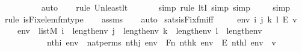 \begin{isabellebody}
\ \ \ \ \ \ \ \isamarkupfalse%
\ auto{\isacharbrackleft}{\kern0pt}{}{\isacharbrackright}{\kern0pt}\isanewline
\ \ \ \isamarkupfalse%
{\isacharparenleft}{\kern0pt}rule\ Un{\isacharunderscore}{\kern0pt}least{\isacharunderscore}{\kern0pt}lt{\isacharparenright}{\kern0pt}{\isacharplus}{\kern0pt}\isanewline
\ \ \ \ \ \ \isamarkupfalse%
{\isacharparenleft}{\kern0pt}simp{\isacharcomma}{\kern0pt}\ rule\ ltI{\isacharcomma}{\kern0pt}\ simp{\isacharcomma}{\kern0pt}\ simp{\isacharparenright}{\kern0pt}{\isacharplus}{\kern0pt}\isanewline
\ \ \ \isamarkupfalse%
\ simp\isanewline
\ \ \isamarkupfalse%
{\isacharparenleft}{\kern0pt}rule\ is{\isacharunderscore}{\kern0pt}Fix{\isacharunderscore}{\kern0pt}elem{\isacharunderscore}{\kern0pt}fm{\isacharunderscore}{\kern0pt}type{\isacharparenright}{\kern0pt}\isanewline
\ \ \isamarkupfalse%
\ assms\isanewline
\ \ \isamarkupfalse%
\ auto%
\endisatagproof
{\isafoldproof}%
%
\isadelimproof
\isanewline
%
\endisadelimproof
\isanewline
{}\isamarkupfalse%
\ sats{\isacharunderscore}{\kern0pt}is{\isacharunderscore}{\kern0pt}Fix{\isacharunderscore}{\kern0pt}fm{\isacharunderscore}{\kern0pt}iff\ {\isacharcolon}{\kern0pt}\ \isanewline
\ \ \ env\ i\ j\ k\ l\ E\ v\ \isanewline
\ \ \ {\isachardoublequoteopen}env\ {\isasymin}\ list{\isacharparenleft}{\kern0pt}M{\isacharparenright}{\kern0pt}{\isachardoublequoteclose}\ {\isachardoublequoteopen}i\ {\isacharless}{\kern0pt}\ length{\isacharparenleft}{\kern0pt}env{\isacharparenright}{\kern0pt}{\isachardoublequoteclose}\ {\isachardoublequoteopen}j\ {\isacharless}{\kern0pt}\ length{\isacharparenleft}{\kern0pt}env{\isacharparenright}{\kern0pt}{\isachardoublequoteclose}\ {\isachardoublequoteopen}k\ {\isacharless}{\kern0pt}\ length{\isacharparenleft}{\kern0pt}env{\isacharparenright}{\kern0pt}{\isachardoublequoteclose}\ {\isachardoublequoteopen}l\ {\isacharless}{\kern0pt}\ length{\isacharparenleft}{\kern0pt}env{\isacharparenright}{\kern0pt}{\isachardoublequoteclose}\isanewline
\ \ \ \ \ \ \ \ \ \ {\isachardoublequoteopen}nth{\isacharparenleft}{\kern0pt}i{\isacharcomma}{\kern0pt}\ env{\isacharparenright}{\kern0pt}\ {\isacharequal}{\kern0pt}\ nat{\isacharunderscore}{\kern0pt}perms{\isachardoublequoteclose}\ {\isachardoublequoteopen}nth{\isacharparenleft}{\kern0pt}j{\isacharcomma}{\kern0pt}\ env{\isacharparenright}{\kern0pt}\ {\isacharequal}{\kern0pt}\ Fn{\isachardoublequoteclose}\ {\isachardoublequoteopen}nth{\isacharparenleft}{\kern0pt}k{\isacharcomma}{\kern0pt}\ env{\isacharparenright}{\kern0pt}\ {\isacharequal}{\kern0pt}\ E{\isachardoublequoteclose}\ {\isachardoublequoteopen}nth{\isacharparenleft}{\kern0pt}l{\isacharcomma}{\kern0pt}\ env{\isacharparenright}{\kern0pt}\ {\isacharequal}{\kern0pt}\ v{\isachardoublequoteclose}\ \isanewline

\end{isabellebody}
